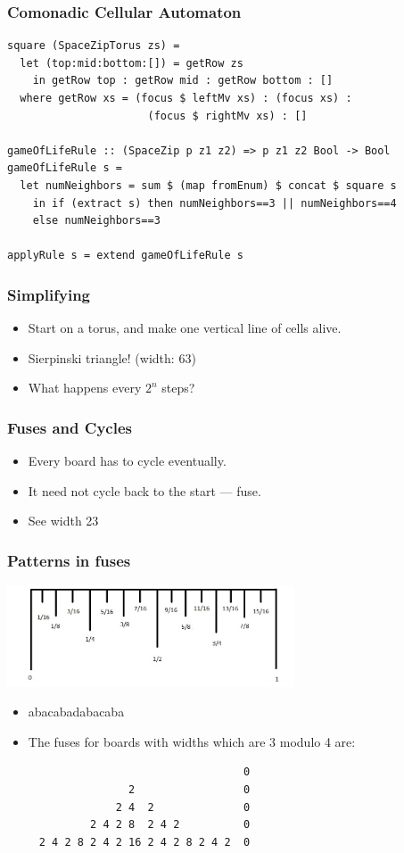 \documentclass[10pt]{beamer}
\begin{document}
\begin{frame}[fragile]
  \frametitle{Comonadic Cellular Automaton}
  \begin{verbatim}
square (SpaceZipTorus zs) =
  let (top:mid:bottom:[]) = getRow zs
    in getRow top : getRow mid : getRow bottom : []
  where getRow xs = (focus $ leftMv xs) : (focus xs) :
                      (focus $ rightMv xs) : []
    
gameOfLifeRule :: (SpaceZip p z1 z2) => p z1 z2 Bool -> Bool
gameOfLifeRule s =
  let numNeighbors = sum $ (map fromEnum) $ concat $ square s
    in if (extract s) then numNeighbors==3 || numNeighbors==4 
    else numNeighbors==3

applyRule s = extend gameOfLifeRule s
  \end{verbatim}
\end{frame}

\begin{frame}
  \frametitle{Simplifying}
  \begin{itemize}
    \item Start on a torus, and make one vertical line of cells alive.
    \item Sierpinski triangle! (width: 63)
    \item What happens every $2^n$ steps?
  \end{itemize}
\end{frame}

\begin{frame}
  \frametitle{Fuses and Cycles}
  \begin{itemize}
    \item Every board has to cycle eventually.
    \item It need not cycle back to the start --- fuse.
    \item See width 23
  \end{itemize}
\end{frame}

\begin{frame}[fragile]
  \frametitle{Patterns in fuses}
  \includegraphics[height=3cm]{ruler}
  \begin{itemize}
    \item abacabadabacaba
    \item The fuses for boards with widths which are 3 modulo 4 are:
  \end{itemize}
\begin{verbatim}
                                     0
                   2                 0                        
                 2 4  2              0
             2 4 2 8  2 4 2          0
     2 4 2 8 2 4 2 16 2 4 2 8 2 4 2  0
\end{verbatim}
\end{frame}
\end{document}
